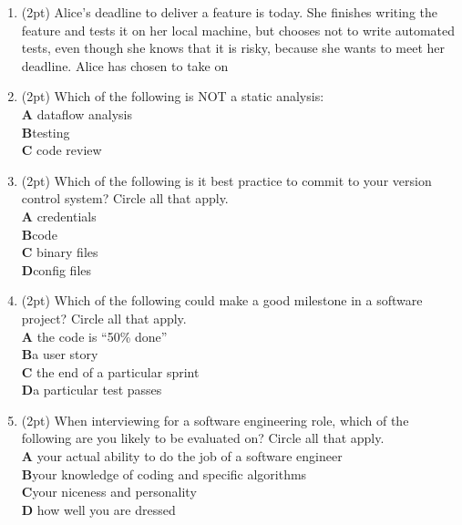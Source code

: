 \documentclass{report}
\newif\ifkey
\newcommand{\correct}[1]{\ifkey\color{red}\textbf{#1}\color{black}\else\textbf{#1}\fi\xspace}
\newcommand{\answershort}[1]{\ifkey\color{red}\underline{\textbf{#1}}\color{black}\else\underline{\hspace{3in}}\fi\xspace}
\newcommand*{\pts}[1]{\addtocounter{points}{#1}(#1pt)}
\begin{document}
\begin{spacing}{1.4}
\begin{enumerate}[leftmargin=*]
\item \pts{2} Alice's deadline to deliver a feature is today. She finishes writing the feature and tests it on her local machine, but chooses not to write automated tests,
  even though she knows that it is risky, because
  she wants to meet her deadline. Alice has chosen to take on \answershort{technical debt}

\item \pts{2}
  Which of the following is NOT a static analysis:
  \\ \textbf{A}\hspace{0.2in} dataflow analysis
  \\ \correct{B}\hspace{0.2in}testing
  \\ \textbf{C}\hspace{0.2in} code review

\item \pts{2}
  Which of the following is it best practice to commit to your version control system? Circle all that apply.
  \\ \textbf{A}\hspace{0.2in} credentials
  \\ \correct{B}\hspace{0.2in}code
  \\ \textbf{C}\hspace{0.2in} binary files
  \\ \correct{D}\hspace{0.2in}config files

\item \pts{2}
  Which of the following could make a good milestone in a software project? Circle all that apply.
  \\ \textbf{A}\hspace{0.2in} the code is ``50\% done''
  \\ \correct{B}\hspace{0.2in}a user story
  \\ \textbf{C}\hspace{0.2in} the end of a particular sprint
  \\ \correct{D}\hspace{0.2in}a particular test passes

\item \pts{2}
  When interviewing for a software engineering role, which of the following are you likely to be evaluated on? Circle all that apply.
  \\ \textbf{A}\hspace{0.2in} your actual ability to do the job of a software engineer
  \\ \correct{B}\hspace{0.2in}your knowledge of coding and specific algorithms
  \\ \correct{C}\hspace{0.2in}your niceness and personality
  \\ \textbf{D}\hspace{0.2in} how well you are dressed
  

\end{enumerate}
\end{spacing}
\end{document}
